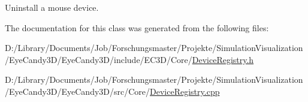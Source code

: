 Uninstall a mouse device. 



The documentation for this class was generated from the following files\+:\begin{DoxyCompactItemize}
\item 
D\+:/\+Library/\+Documents/\+Job/\+Forschungsmaster/\+Projekte/\+Simulation\+Visualization/\+Eye\+Candy3\+D/\+Eye\+Candy3\+D/include/\+E\+C3\+D/\+Core/\mbox{\hyperlink{_device_registry_8h}{Device\+Registry.\+h}}\item 
D\+:/\+Library/\+Documents/\+Job/\+Forschungsmaster/\+Projekte/\+Simulation\+Visualization/\+Eye\+Candy3\+D/\+Eye\+Candy3\+D/src/\+Core/\mbox{\hyperlink{_device_registry_8cpp}{Device\+Registry.\+cpp}}\end{DoxyCompactItemize}
